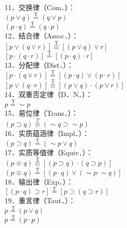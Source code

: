 11．交换律（Com．）：\\
$(p \vee q) \stackrel{\mathrm{T}}{=}(q \vee p)$\\
$(p \cdot q) \stackrel{\mathrm{T}}{=}(q \cdot p)$\\
12．结合律（Assoc．）：\\
$[p \vee(q \vee r)] \stackrel{\mathrm{T}}{\equiv}[(p \vee q) \vee r]$\\
$[p \cdot(q \cdot r)] \stackrel{\mathrm{T}}{=}[(p \cdot q) \cdot r]$\\
13．分配律（Dist．）：\\
$[p \cdot(q \vee r)] \stackrel{\mathrm{T}}{=}[(p \cdot q) \vee(p \cdot r)]$\\
$[p \vee(q \cdot r)] \stackrel{\mathrm{T}}{\equiv}[(p \vee q) \cdot(p \vee r)]$\\
14．双重否定律（D．N．）：\\
$p \stackrel{\mathrm{~T}}{=} \sim p$\\
15．易位律（Trans．）：\\
$(p \supset q) \stackrel{T}{\equiv}(\sim q \supset \sim p)$\\
16．实质蕴涵律（Impl．）：\\
$(p \supset q) \stackrel{\mathrm{T}}{=}(\sim p \vee q)$\\
17．实质等值律（Equiv．）：\\
$(p \equiv q) \stackrel{\mathrm{T}}{\equiv}[(p \supset q) \cdot(q \supset p)]$\\
$(p \equiv q) \stackrel{\mathrm{T}}{=}[(p \cdot q) \vee(\sim p \cdot \sim q)]$\\
18．输出律（Exp．）：\\
$[(p \cdot q) \supset r] \stackrel{\mathrm{T}}{=}[p \supset(q \supset r)]$\\
19．重言律（Taut．）：\\
$p \stackrel{\mathrm{~T}}{=}(p \vee q)$\\
$p \stackrel{\mathrm{~T}}{=}(p \cdot p)$ 
